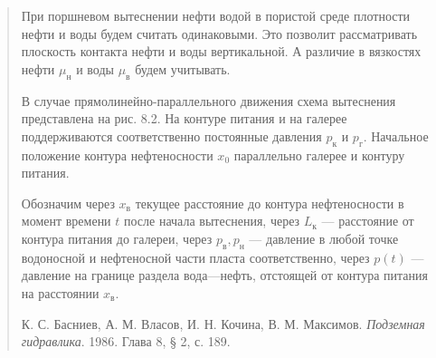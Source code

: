 \documentclass[12pt,a4paper]{article}
\begin{document}
\begin{quote}\sloppy
При поршневом вытеснении нефти водой в пористой среде плотности нефти и воды будем считать одинаковыми. Это позволит рассматривать плоскость контакта нефти и воды вертикальной. А различие в вязкостях нефти $\mu_\text{н}$ и воды $\mu_\text{в}$ будем учитывать.

В случае прямолинейно-параллельного движения схема вытеснения представлена на рис. 8.2. На контуре питания и на галерее поддерживаются соответственно постоянные давления $p_\text{к}$ и $p_\text{г}$. Начальное положение контура нефтеносности $x_0$ параллельно галерее и контуру питания.

Обозначим через $x_\text{в}$ текущее расстояние до контура нефтеносности в момент времени $t$ после начала вытеснения, через $L_\text{к}$ --- расстояние от контура питания до галереи, через $p_\text{в},p_\text{н}$ --- давление в любой точке водоносной и нефтеносной части пласта соответственно, через $p(t)$ --- давление на границе раздела вода---нефть, отстоящей от контура питания на расстоянии $x_\text{в}$.
\par\nobreak\smallskip
{\small К. С. Басниев, А. М. Власов, И. Н. Кочина, В. М. Максимов. \textit{Подземная гидравлика}. 1986. Глава 8, § 2, с. 189.}\par
\end{quote}
\end{document}
